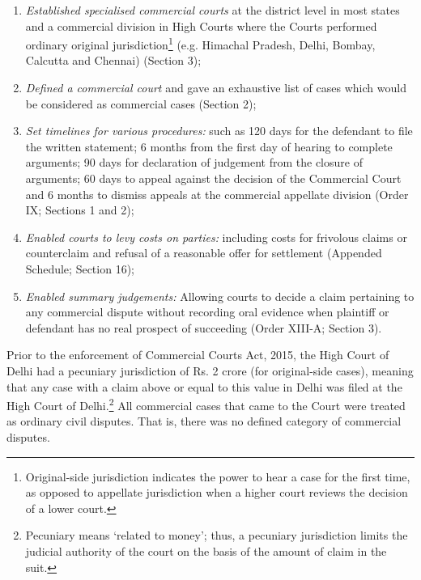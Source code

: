 \documentclass[a4paper, 12pt, twoside]{article}
\begin{document}
\begin{enumerate}
\item \textit{Established specialised commercial courts} at the district level in most states and a commercial division in High Courts where the Courts performed ordinary original jurisdiction\footnote{Original-side jurisdiction indicates the power to hear a case for the first time, as opposed to appellate jurisdiction when a higher court reviews the decision of a lower court.} (e.g. Himachal Pradesh, Delhi, Bombay, Calcutta and Chennai) (Section 3);
\item \textit{Defined a commercial court} and gave an exhaustive list of cases which would be considered as commercial cases (Section 2); 
\item \textit{Set timelines for various procedures:} such as 120 days for the defendant to file the written statement; 6 months from the first day of hearing to complete arguments; 90 days for declaration of judgement from the closure of arguments; 60 days to appeal against the decision of the Commercial Court and 6 months to dismiss appeals at the commercial appellate division (Order IX; Sections 1 and 2); 
\item \textit{Enabled courts to levy costs on parties:} including costs for frivolous claims or counterclaim and refusal of a reasonable offer for settlement (Appended Schedule; Section 16);
\item \textit{Enabled summary judgements:} Allowing courts to decide a claim pertaining to any commercial dispute without recording oral evidence when plaintiff or defendant has no real prospect of succeeding (Order XIII-A; Section 3).
\end{enumerate}

Prior to the enforcement of Commercial Courts Act, 2015, the High Court of Delhi had a pecuniary jurisdiction of Rs. 2 crore (for original-side cases), meaning that any case with a claim above or equal to this value in Delhi was filed at the High Court of Delhi.\footnote{ Pecuniary means ‘related to money’; thus, a pecuniary jurisdiction limits the judicial authority of the court on the basis of the amount of claim in the suit.} All commercial cases that came to the Court were treated as ordinary civil disputes. That is, there was no defined category of commercial disputes. \\
\end{document}
